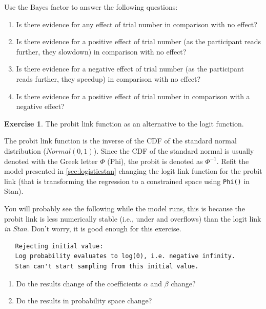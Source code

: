 \documentclass[12pt,]{krantz}
\providecommand{\tightlist}{%
  \setlength{\itemsep}{0pt}\setlength{\parskip}{0pt}}
\theoremstyle{definition}
\theoremstyle{definition}
\theoremstyle{definition}
\newtheorem{exercise}{Exercise}[chapter]
\theoremstyle{remark}
\begin{document}
Use the Bayes factor to answer the following questions:

\begin{enumerate}
\def\labelenumi{\alph{enumi}.}
\tightlist
\item
  Is there evidence for any effect of trial number in comparison with no
  effect?
\item
  Is there evidence for a positive effect of trial number (as the
  participant reads further, they slowdown) in comparison with no
  effect?
\item
  Is there evidence for a negative effect of trial number (as the
  participant reads further, they speedup) in comparison with no effect?
\item
  Is there evidence for a positive effect of trial number in comparison
  with a negative effect?
\end{enumerate}

\begin{exercise}
\protect\hypertarget{exr:linkfunction}{}{\label{exr:linkfunction} }The
probit link function as an alternative to the logit function.
\end{exercise}

The probit link function is the inverse of the CDF of the standard
normal distribution (\(Normal(0,1)\)). Since the CDF of the standard
normal is usually denoted with the Greek letter \(\Phi\) (Phi), the
probit is denoted as \(\Phi^{-1}\). Refit the model presented in
\ref{sec:logisticstan} changing the logit link function for the probit
link (that is transforming the regression to a constrained space using
\texttt{Phi()} in Stan).

You will probably see the following while the model runs, this is
because the probit link is less numerically stable (i.e., under and
overflows) than the logit link \emph{in Stan}. Don't worry, it is good
enough for this exercise.

\begin{verbatim}
   Rejecting initial value:
   Log probability evaluates to log(0), i.e. negative infinity.
   Stan can't start sampling from this initial value.
\end{verbatim}

\begin{enumerate}
\def\labelenumi{\alph{enumi}.}
\tightlist
\item
  Do the results change of the coefficients \(\alpha\) and \(\beta\)
  change?
\item
  Do the results in probability space change?
\end{enumerate}
\end{document}
